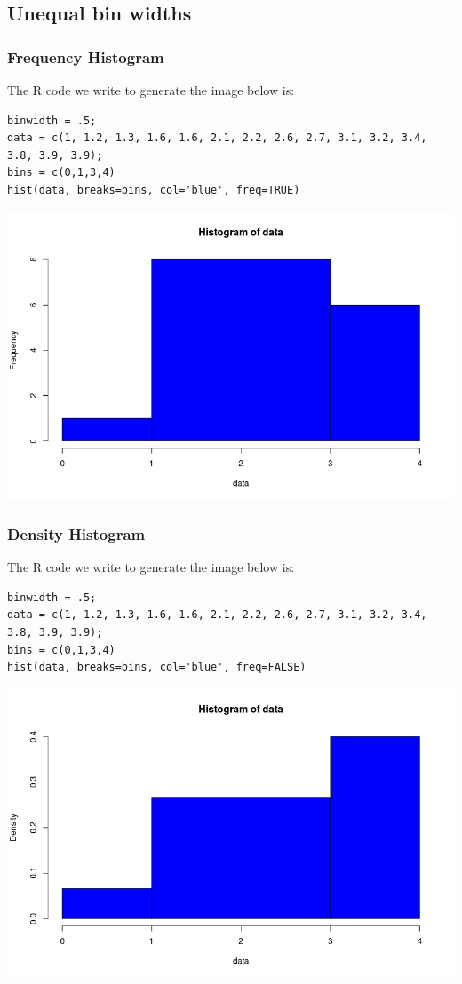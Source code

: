 \documentclass[a4paper,11pt]{article}
\begin{document}
\subsection{Unequal bin widths}

\subsubsection{Frequency Histogram}

The R code we write to generate the image below is:

\begin{lstlisting}
binwidth = .5;
data = c(1, 1.2, 1.3, 1.6, 1.6, 2.1, 2.2, 2.6, 2.7, 3.1, 3.2, 3.4, 3.8, 3.9, 3.9);
bins = c(0,1,3,4)
hist(data, breaks=bins, col='blue', freq=TRUE)
\end{lstlisting}

\includegraphics[scale=0.5]{freql-unequal-hist.png}

\subsubsection{Density Histogram}

The R code we write to generate the image below is:
\begin{lstlisting}
binwidth = .5;
data = c(1, 1.2, 1.3, 1.6, 1.6, 2.1, 2.2, 2.6, 2.7, 3.1, 3.2, 3.4, 3.8, 3.9, 3.9);
bins = c(0,1,3,4)
hist(data, breaks=bins, col='blue', freq=FALSE)
\end{lstlisting}

\includegraphics[scale=0.5]{dens-hist-unequal}
\end{document}
